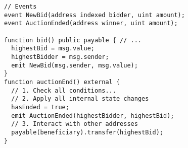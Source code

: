 \begin{lstlisting}[language=Solidity]
// Events
event NewBid(address indexed bidder, uint amount);
event AuctionEnded(address winner, uint amount);

function bid() public payable { // ...
  highestBid = msg.value;
  highestBidder = msg.sender;
  emit NewBid(msg.sender, msg.value);
}
function auctionEnd() external { 
  // 1. Check all conditions...
  // 2. Apply all internal state changes
  hasEnded = true;
  emit AuctionEnded(highestBidder, highestBid);
  // 3. Interact with other addresses
  payable(beneficiary).transfer(highestBid);
}

\end{lstlisting}